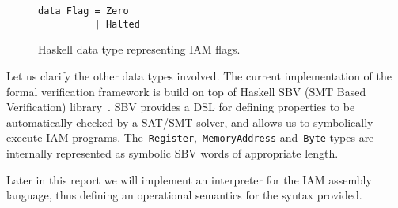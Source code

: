 \begin{figure}[H]
\begin{verbatim}
data Flag = Zero
          | Halted
\end{verbatim}
\caption{Haskell data type representing IAM flags.}
\label{Flags}
\end{figure}

Let us clarify the other data types involved. The current implementation of the formal verification
framework is build on top of Haskell SBV (SMT Based Verification)
library~\cite{SBV}. SBV provides a DSL for defining properties to be automatically
checked by a SAT/SMT solver, and allows us to symbolically execute IAM programs.
The~\texttt{Register},~\texttt{MemoryAddress}
and~\texttt{Byte} types are internally represented as symbolic
SBV words of appropriate length.

Later in this report we will implement an interpreter for the IAM assembly language,
thus defining an operational semantics for the syntax provided.
